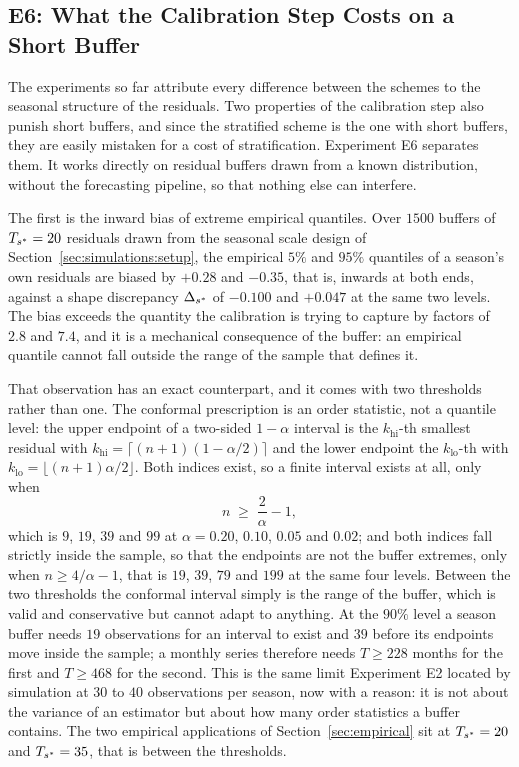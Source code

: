 \subsection{E6: What the Calibration Step Costs on a Short Buffer}
\label{sec:simulations:e6constr}

The experiments so far attribute every difference between the schemes to
the seasonal structure of the residuals.  Two properties of the
calibration step also punish short buffers, and since the stratified
scheme is the one with short buffers, they are easily mistaken for a cost
of stratification.  Experiment E6 separates them.  It works directly on
residual buffers drawn from a known distribution, without the forecasting
pipeline, so that nothing else can interfere.

The first is the inward bias of extreme empirical quantiles.  Over $1500$
buffers of $T_{s^*} = 20$ residuals drawn from the seasonal scale design of
Section~\ref{sec:simulations:setup}, the empirical $5\%$ and $95\%$
quantiles of a season's own residuals are biased by $+0.28$ and $-0.35$,
that is, inwards at both ends, against a shape discrepancy
$\Delta_{s^*}$ of $-0.100$ and $+0.047$ at the same two levels.  The
bias exceeds the quantity the calibration is trying to capture by factors
of $2.8$ and $7.4$, and it is a mechanical consequence of the buffer: an
empirical quantile cannot fall outside the range of the sample that
defines it.

That observation has an exact counterpart, and it comes with two
thresholds rather than one.  The conformal prescription is an order
statistic, not a quantile level: the upper endpoint of a two-sided
$1-\alpha$ interval is the $k_{\text{hi}}$-th smallest residual with
$k_{\text{hi}} = \lceil (n+1)(1-\alpha/2)\rceil$ and the lower endpoint
the $k_{\text{lo}}$-th with
$k_{\text{lo}} = \lfloor (n+1)\alpha/2 \rfloor$.  Both indices exist,
so a finite interval exists at all, only when
\begin{equation}
  \label{eq:feasible}
  n \;\geq\; \frac{2}{\alpha} - 1,
\end{equation}
which is $9$, $19$, $39$ and $99$ at $\alpha = 0.20$, $0.10$, $0.05$ and
$0.02$; and both indices fall strictly inside the sample, so that the
endpoints are not the buffer extremes, only when
$n \geq 4/\alpha - 1$, that is $19$, $39$, $79$ and $199$ at the same
four levels.  Between the two thresholds the conformal interval simply is
the range of the buffer, which is valid and conservative but cannot adapt
to anything.  At the $90\%$ level a season buffer needs $19$ observations
for an interval to exist and $39$ before its endpoints move inside the
sample; a monthly series therefore needs $T \geq 228$ months for the first
and $T \geq 468$ for the second.  This is the same limit Experiment E2
located by simulation at $30$ to $40$ observations per season, now with a
reason: it is not about the variance of an estimator but about how many
order statistics a buffer contains.  The two empirical applications of
Section~\ref{sec:empirical} sit at $T_{s^*} = 20$ and $T_{s^*} = 35$, that is
between the thresholds.

